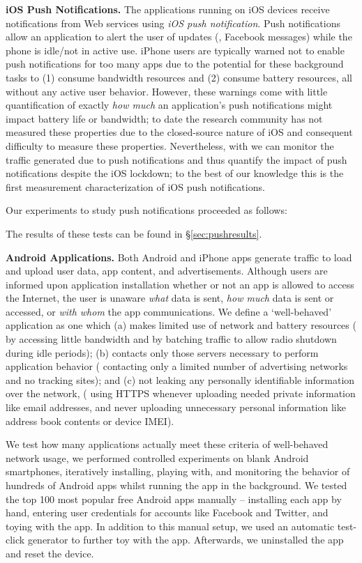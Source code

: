   {\bf iOS Push Notifications.}
  The applications running on iOS devices receive notifications from Web services using \emph{iOS push notification}. 
  Push notifications allow an application to alert the user of updates (\eg{}, Facebook messages) while the phone is idle/not in active use.
  iPhone users are typically warned not to enable push notifications for too many apps due to the potential for these background tasks to (1) consume bandwidth resources and (2) consume battery resources, all without any active user behavior.
  However, these warnings come with little quantification of exactly {\it how much} an application's push notifications might impact battery life or bandwidth; to date the research community has not measured these properties due to the closed-source nature of iOS and consequent difficulty to measure these properties.
  Nevertheless, with \platname we can monitor the traffic generated due to push notifications and thus quantify the impact of push notifications despite the iOS lockdown; to the best of our knowledge this is the first measurement characterization of iOS push notifications.

  Our experiments to study push notifications proceeded as follows:

  The results of these tests can be found in \S\ref{sec:pushresults}.

  {\bf Android Applications.}
  Both Android and iPhone apps generate traffic to load and upload user data, app content, and advertisements.
  Although users are informed upon application installation whether or not an app is allowed to access the Internet, the user is unaware {\it what} data is sent, {\it how much} data is sent or accessed, or {\it with whom} the app communications.
  We define a `well-behaved' application as one which (a) makes limited use of network and battery resources (\ie{} by accessing little bandwidth and by batching traffic to allow radio shutdown during idle periods); (b) contacts only those servers necessary to perform application behavior (\ie{} contacting only a limited number of advertising networks and no tracking sites); and (c) not leaking any personally identifiable information over the network, (\ie{} using HTTPS whenever uploading needed private information like email addresses, and never uploading unnecessary personal information like address book contents or device IMEI). 

  We test how many applications actually meet these criteria of well-behaved network usage, we performed controlled experiments on blank Android smartphones, iteratively installing, playing with, and monitoring the behavior of hundreds of Android apps whilst running the \platname app in the background.
  We tested the top 100 most popular free Android apps manually -- installing each app by hand, entering user credentials for accounts like Facebook and Twitter, and toying with the app. In addition to this manual setup, we used an automatic test-click generator to further toy with the app. Afterwards, we uninstalled the app and reset the device.
  
